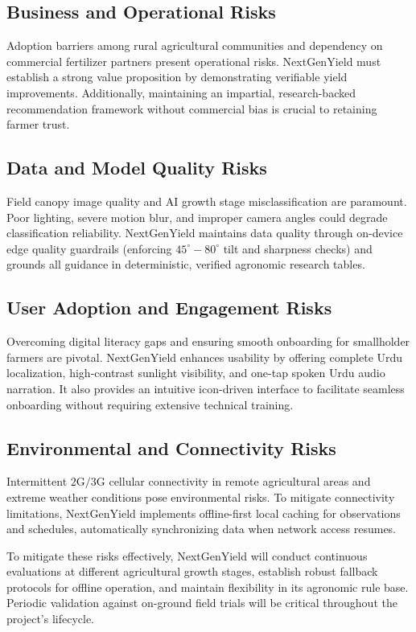 \subsection{Business and Operational Risks}
Adoption barriers among rural agricultural communities and dependency on commercial fertilizer partners present operational risks. NextGenYield must establish a strong value proposition by demonstrating verifiable yield improvements. Additionally, maintaining an impartial, research-backed recommendation framework without commercial bias is crucial to retaining farmer trust.

\subsection{Data and Model Quality Risks}
Field canopy image quality and AI growth stage misclassification are paramount. Poor lighting, severe motion blur, and improper camera angles could degrade classification reliability. NextGenYield maintains data quality through on-device edge quality guardrails (enforcing $45^\circ - 80^\circ$ tilt and sharpness checks) and grounds all guidance in deterministic, verified agronomic research tables.

\subsection{User Adoption and Engagement Risks}
Overcoming digital literacy gaps and ensuring smooth onboarding for smallholder farmers are pivotal. NextGenYield enhances usability by offering complete Urdu localization, high-contrast sunlight visibility, and one-tap spoken Urdu audio narration. It also provides an intuitive icon-driven interface to facilitate seamless onboarding without requiring extensive technical training.

\subsection{Environmental and Connectivity Risks}
Intermittent $2\text{G}/3\text{G}$ cellular connectivity in remote agricultural areas and extreme weather conditions pose environmental risks. To mitigate connectivity limitations, NextGenYield implements offline-first local caching for observations and schedules, automatically synchronizing data when network access resumes.

To mitigate these risks effectively, NextGenYield will conduct continuous evaluations at different agricultural growth stages, establish robust fallback protocols for offline operation, and maintain flexibility in its agronomic rule base. Periodic validation against on-ground field trials will be critical throughout the project's lifecycle.

